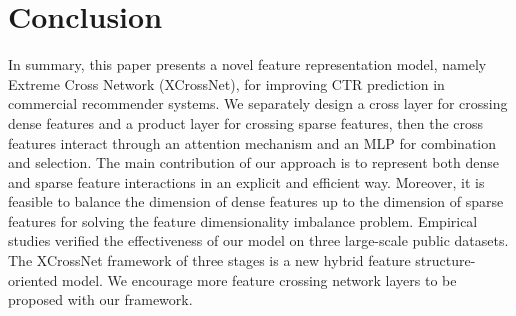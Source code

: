 \documentclass[letterpaper]{article} \usepackage{aaai21}  \usepackage{times}  \usepackage{helvet} \usepackage{courier}  \usepackage[hyphens]{url}  \usepackage{graphicx} \urlstyle{rm} \def\UrlFont{\rm}  \usepackage{natbib}  \usepackage{caption} \frenchspacing  \setlength{\pdfpagewidth}{8.5in}  \setlength{\pdfpageheight}{11in}  \usepackage{graphicx}
\begin{document}
\section{Conclusion}

In summary, this paper presents a novel feature representation model, namely Extreme Cross Network (XCrossNet), for improving CTR prediction in commercial recommender systems.  
We separately design a cross layer for crossing dense features and a product layer for crossing sparse features, then the cross features interact through an attention mechanism and an MLP for combination and selection.
The main contribution of our approach is to represent both dense and sparse feature interactions in an explicit and efficient way. Moreover, it is feasible to balance the dimension of dense features up to the dimension of sparse features for solving the feature dimensionality imbalance problem.
Empirical studies verified the effectiveness of our model on three large-scale public datasets.
The XCrossNet framework of three stages is a new hybrid feature structure-oriented model. We encourage more feature crossing network layers to be proposed with our framework.



\appendix


\end{document}
